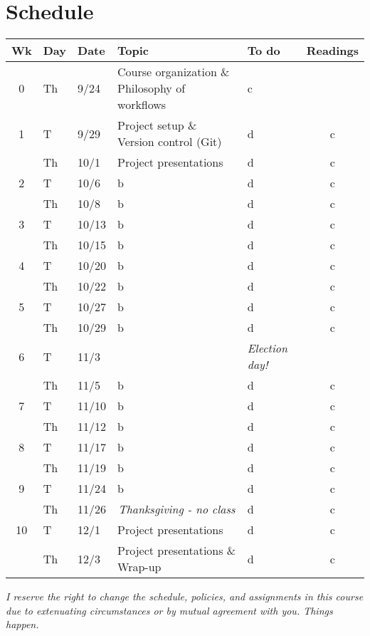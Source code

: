 \documentclass[10pt]{article}
\begin{document}
\section*{Schedule}
\begin{tabular}{cllllc}%
	\hline\hline
	Wk  & Day & Date &Topic & To do & Readings\\ 
	\hline
	\hline
	0 &  Th		& 9/24 		& Course organization \& Philosophy of workflows	& c & \\
	1 & T  		& 9/29 		&  Project setup \& Version control (Git) & d & c\\
		& Th 	& 10/1 		& Project presentations	 & d & c\\
	2 &  T 		& 10/6		& b					&  d & c\\
		&  Th 	& 10/8 		&b&  d & c\\
	3 &  T		 & 10/13 	& b&  d& c\\
		&  Th 	& 10/15		& b&  d& c\\
	4 &  T 		& 10/20		& b& d & c\\
		&  Th 	& 10/22		& b& d & c\\
	5 &  T 		& 10/27		& b&  d& c\\
		&  Th 	& 10/29		& b& d & c\\
	6 &  T 		& 11/3		& &  \textit{Election day!} \\
		&  Th	& 11/5		 & b&  d& c\\
	7 &  T 		& 11/10		& b&  d& c\\
		&  Th 	& 11/12		& b& d & c\\
	8 &  T 		& 11/17		& b& d & c\\
		&  Th 	& 11/19		& b& d & c\\
	9 &  T 	& 11/24		& b&  d& c\\
		&  Th 	& 11/26		& \multicolumn{1}{c}{ \textit{Thanksgiving - no class} }& d & c \\
	10 &  T 	& 12/1		& Project presentations & d & c\\
	&  Th 	& 12/3		&  Project presentations \& Wrap-up & d& c \\
	\hline
	\hline
\end{tabular}

\begin{center}
\emph{
	I reserve the right to change the schedule, policies, and assignments in this course due to 
	extenuating circumstances or by mutual agreement with you.
	Things happen.
}
\end{center}

\pagebreak
\end{document}
